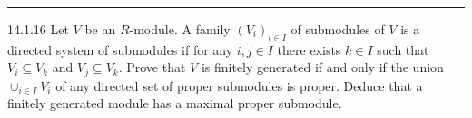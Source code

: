 \documentclass[a4paper, 12pt]{article}
\begin{document}
\noindent\rule{7in}{2.8pt}
\begin{problem}{14.1.16}
Let \(V\) be an \(R\)-module. A family \((V_i)_{i\in I}\) of submodules of \(V\) is a directed system of submodules if for any \(i,j\in I\) there exists \(k\in I\) such that \
\(V_i\subseteq V_k\) and \(V_j\subseteq V_k\). Prove that \(V\) is finitely generated if and only if the union \(\cup_{i\in I}V_i\) of any directed set of proper submodules is proper. Deduce that 
a finitely generated module has a maximal proper submodule.
\end{problem}
\end{document}
